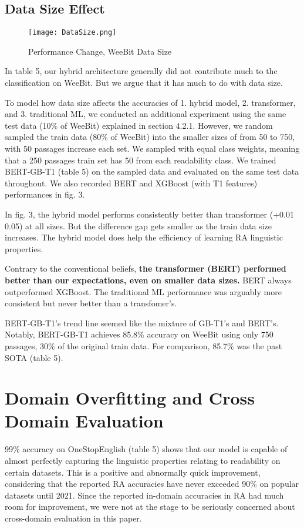\documentclass[11pt]{article}
\begin{document}
\subsection{Data Size Effect}
\begin{figure}
    \raggedright
    \texttt{[image: DataSize.png]}
    \caption{Performance Change, WeeBit Data Size}
    \label{fig:2}
\end{figure}
In table 5, our hybrid architecture generally did not contribute much to the classification on WeeBit. But we argue that it has much to do with data size.

To model how data size affects the accuracies of 1. hybrid model, 2. transformer, and 3. traditional ML, we conducted an additional experiment using the same test data (10\% of WeeBit) explained in section 4.2.1. However, we random sampled the train data (80\% of WeeBit) into the smaller sizes of from 50 to 750, with 50 passages increase each set. We sampled with equal class weights, meaning that a 250 passages train set has 50 from each readability class. We trained BERT-GB-T1 (table 5) on the sampled data and evaluated on the same test data throughout. We also recorded BERT and XGBoost (with T1 features) performances in fig. 3.

In fig. 3, the hybrid model performs consistently better than transformer (+0.01  0.05) at all sizes. But the difference gap gets smaller as the train data size increases. The hybrid model does help the efficiency of learning RA linguistic properties. 

Contrary to the conventional beliefs, \textbf{the transformer (BERT) performed better than our expectations, even on smaller data sizes.} BERT always outperformed XGBoost. The traditional ML performance was arguably more consistent but never better than a transfomer's.

BERT-GB-T1's trend line seemed like the mixture of GB-T1's and BERT's. Notably, BERT-GB-T1 achieves 85.8\% accuracy on WeeBit using only 750 passages, 30\% of the original train data. For comparison, 85.7\% was the past SOTA (table 5).

\section{Domain Overfitting and Cross Domain Evaluation}
99\% accuracy on OneStopEnglish (table 5) shows that our model is capable of almost perfectly capturing the linguistic properties relating to readability on certain datasets. This is a positive and abnormally quick improvement, considering that the reported RA accuracies have never exceeded 90\% on popular datasets \citep{Vajjala:12, xu2015problems, Xia:16, Vajjala:18} until 2021. Since the reported in-domain accuracies in RA had much room for improvement, we were not at the stage to be seriously concerned about cross-domain evaluation \citep{vstajner2018detailed} in this paper. 
\end{document}
